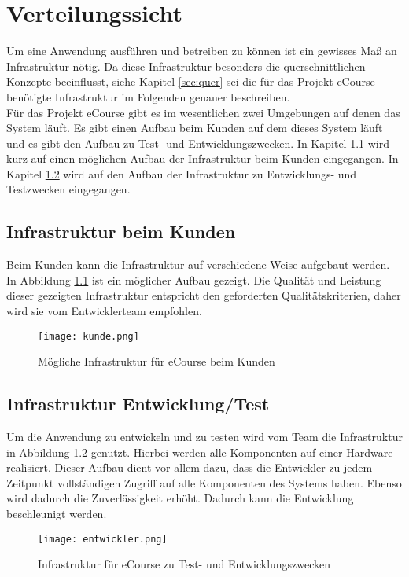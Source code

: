 \chapter{Verteilungssicht}
Um eine Anwendung ausführen und betreiben zu können ist ein gewisses Maß an Infrastruktur nötig. Da diese Infrastruktur besonders die querschnittlichen Konzepte beeinflusst, siehe Kapitel \ref{sec:quer} sei die für das Projekt eCourse benötigte Infrastruktur im Folgenden genauer beschreiben. \\

Für das Projekt eCourse gibt es im wesentlichen zwei Umgebungen auf denen das System läuft. Es gibt einen Aufbau beim Kunden auf dem dieses System läuft und es gibt den Aufbau zu Test- und Entwicklungszwecken. In Kapitel \ref{sec:Kunde} wird kurz auf einen möglichen Aufbau der Infrastruktur beim Kunden eingegangen. In Kapitel \ref{sec:Entwicklung} wird auf den Aufbau der Infrastruktur zu Entwicklungs- und Testzwecken eingegangen.
\section{Infrastruktur beim Kunden}
\label{sec:Kunde}
Beim Kunden kann die Infrastruktur auf verschiedene Weise aufgebaut werden. In Abbildung \ref{fib:Kunde} ist ein möglicher Aufbau gezeigt. Die Qualität und Leistung dieser gezeigten Infrastruktur entspricht den geforderten Qualitätskriterien, daher wird sie vom Entwicklerteam empfohlen.

\begin{figure}[H]
\centering
\texttt{[image: kunde.png]}
\caption{Mögliche Infrastruktur für eCourse beim Kunden}
\label{fib:Kunde}
\end{figure}


\section{Infrastruktur Entwicklung/Test}
\label{sec:Entwicklung}
Um die Anwendung zu entwickeln und zu testen wird vom Team die Infrastruktur in Abbildung \ref{fib:Entwickler} genutzt. Hierbei werden alle Komponenten auf einer Hardware realisiert. Dieser Aufbau dient vor allem dazu, dass die Entwickler zu jedem Zeitpunkt vollständigen Zugriff auf alle Komponenten des Systems haben. Ebenso wird dadurch die Zuverlässigkeit erhöht. Dadurch kann die Entwicklung beschleunigt werden.

\begin{figure}[H]
\centering
\texttt{[image: entwickler.png]}
\caption{Infrastruktur für eCourse zu Test- und Entwicklungszwecken}
\label{fib:Entwickler}
\end{figure}